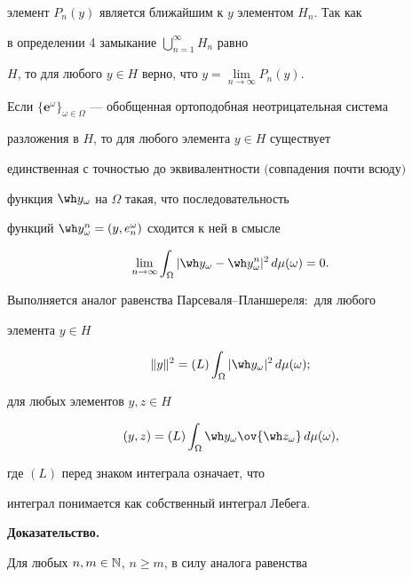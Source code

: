 элемент $P_n(y)$ является ближайшим к $y$ элементом $H_n$. Так как


в определении 4 замыкание ${\bigcup_{n=1}^\infty H_n}$ равно


$H$, то для любого $y\in H$ верно, что $y=\lim\limits_{n\to\infty}P_n(y)$.





\begin{thm}\hspace{-1.8mm}{\bf.}


Если $\{\boldsymbol e^\omega\}_{\omega\in


\Omega}$ --- обобщенная ортоподобная неотрицательная система


разложения в $H$, то для любого элемента $y\in H$ существует


единственная с точностью до эквивалентности $($совпадения почти всюду$)$


функция $\wh y_\omega$ на $\Omega$ такая, что последовательность


функций $\wh y^n_\omega=(y,e^\omega_n)$ сходится к ней в смысле


$$


\lim_{n\to\infty}\int_\Omega|\wh y_\omega-\wh


y_\omega^n|^2\,d\mu(\omega)=0.


$$


Выполняется аналог равенства Парсеваля--Планшереля$:$ для любого


элемента $y\in H$


$$


\| y\|^2 =(L)\int_\Omega|\wh y_\omega|^2\,d\mu(\omega);


$$


для любых элементов $y,z\in H$


$$


(y,z)=(L)\int_\Omega\wh y_\omega\ov{\wh


z_\omega}\,d\mu (\omega ),


$$


где $(L)$ перед знаком интеграла означает, что


интеграл понимается как собственный интеграл Лебега.


\end{thm}





{\bf Доказательство.}


Для любых $n,m\in\Bbb N$, $n\geqslant m$, в силу аналога равенства


